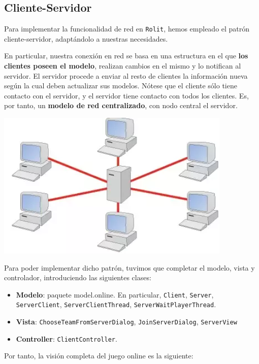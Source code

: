 \documentclass[../DocumentoOficial.tex]{subfiles}
\begin{document}
\newpage

\subsection{Cliente-Servidor}

Para implementar la funcionalidad de red en \texttt{Rolit}, hemos empleado el patrón cliente-servidor, adaptándolo a nuestras necesidades.

En particular, nuestra conexión en red se basa en una estructura en el que \textbf{los clientes poseen el modelo}, realizan cambios en el mismo y lo notifican al servidor. El servidor procede a enviar al resto de clientes la información nueva según la cual deben actualizar sus modelos. Nótese que el cliente sólo tiene contacto con el servidor, y el servidor tiene contacto con todos los clientes. Es, por tanto, un \textbf{modelo de red centralizado}, con nodo central el servidor.

\begin{center}
\includegraphics[scale=0.8]{redCentralizada.png} 
\end{center}

Para poder implementar dicho patrón, tuvimos que completar el modelo, vista y controlador, introduciendo las siguientes clases:
\begin{itemize}
\item \textbf{Modelo}: paquete model.online. En particular, \texttt{Client}, \texttt{Server}, \texttt{ServerClient}, \texttt{ServerClientThread}, \texttt{ServerWaitPlayerThread}.
\item \textbf{Vista}: \texttt{ChooseTeamFromServerDialog}, \texttt{JoinServerDialog}, \texttt{ServerView}
\item \textbf{Controller}: \texttt{ClientController}.
\end{itemize}
Por tanto, la visión completa del juego online es la siguiente:
\end{document}
